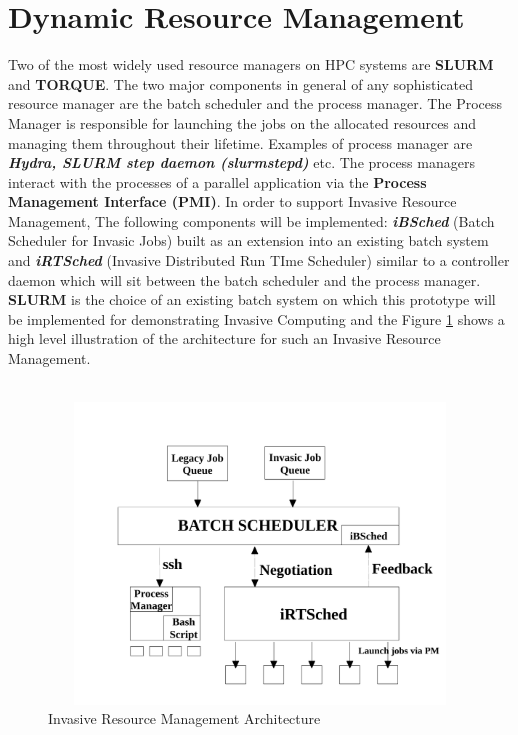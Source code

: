 \section{Dynamic Resource Management}
Two of the most widely used resource managers on HPC systems are \textbf{SLURM} and \textbf{TORQUE}. The two major components in general of any sophisticated resource manager are the batch scheduler and the process manager. The Process Manager is responsible for launching the jobs on the allocated resources and managing them throughout their lifetime. Examples of process manager are \textbf{\textit{Hydra, SLURM step daemon (slurmstepd)}} etc. The process managers interact with the processes of a parallel application via the \textbf{Process Management Interface (PMI)}. In order to support Invasive Resource Management, The following components will be implemented: \textbf{\textit{iBSched}} (Batch Scheduler for Invasic Jobs) built as an extension into an existing batch system and \textbf{\textit{iRTSched}} (Invasive Distributed Run TIme Scheduler) similar to a controller daemon which will sit between the batch scheduler and the process manager. \textbf{SLURM} is the choice of an existing batch system on which this prototype will be implemented for demonstrating Invasive Computing and the Figure \ref{fig:1} shows a high level illustration of the architecture for such an Invasive Resource Management.\\ \\
\begin{figure}[!htbp]
\centering
\vspace{-0.35in}
\includegraphics[width=1.0\textwidth, height=80mm]{./figures/architecture.pdf}
\caption{Invasive Resource Management Architecture}
\label{fig:1}
\end{figure}
\noindent
